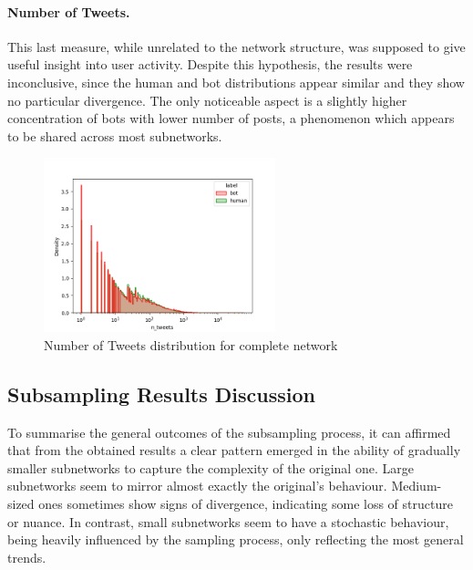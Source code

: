 \documentclass[12pt, a4paper]{article}
\begin{document}
        \paragraph{Number of Tweets.} This last measure, while unrelated to the network structure, was supposed to give useful insight into user activity. Despite this hypothesis, the results were inconclusive, since the human and bot distributions appear similar and they show no particular divergence. The only noticeable aspect is a slightly higher concentration of bots with lower number of posts, a phenomenon which appears to be shared across most subnetworks.
        \begin{figure}[H]
        	\centering
        	\includegraphics[width=0.6\textwidth]{complete_n_tweets_distribution.png}
            \caption{Number of Tweets distribution for complete network}
      	\end{figure}
    \subsection{Subsampling Results Discussion} \label{subsampling_results}
    	To summarise the general outcomes of the subsampling process, it can affirmed that from the obtained results a clear pattern emerged in the ability of gradually smaller subnetworks to capture the complexity of the original one. Large subnetworks seem to mirror almost exactly the original's behaviour. Medium-sized ones sometimes show signs of divergence, indicating some loss of structure or nuance. In contrast, small subnetworks seem to have a stochastic behaviour, being heavily influenced by the sampling process, only reflecting the most general trends.
\end{document}
